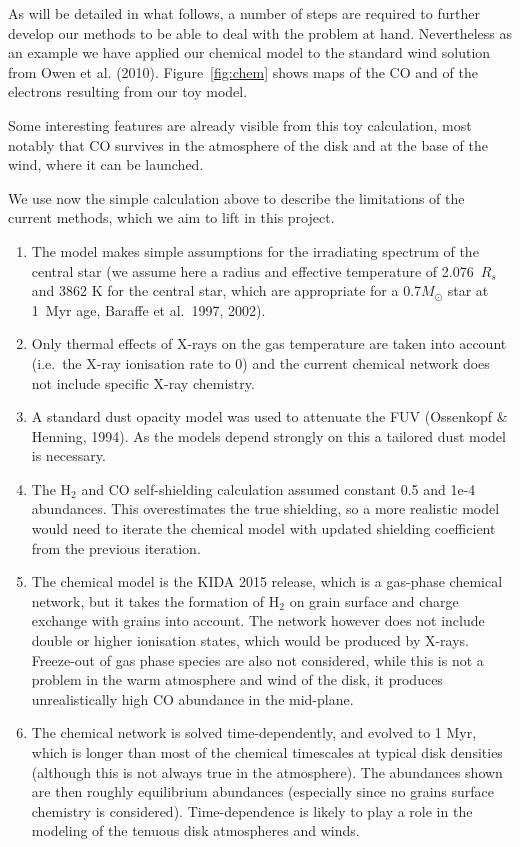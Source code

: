 \documentclass[10pt,fleqn,twoside]{article}
\begin{document}
As will be detailed in what follows, a number of steps are required to
further develop our methods to be able to deal with the problem at
hand. Nevertheless as an example we have applied our chemical model to
the standard wind solution from Owen et
al. (2010). Figure~\ref{fig:chem} shows maps of the CO and of the
electrons resulting from our toy model. 


Some interesting features are already visible from this toy
calculation, most notably that CO survives in the atmosphere of the
disk and at the base of the wind, where it can be launched. 

We use now the simple calculation above to describe the limitations of
the current methods, which we aim to lift in this project. 

\begin{enumerate}
\item The model makes simple assumptions for the irradiating spectrum
of the central star (we assume here a radius and effective temperature
of 2.076~$R_s$ and 3862 K for the central star, which are appropriate
for a 0.7$M_{\odot}$ star at 1~Myr age, Baraffe et al.\ 1997, 2002).

\item Only thermal effects of X-rays on the gas
temperature are taken into account (i.e.\ the X-ray ionisation rate
to 0) and the current chemical network does not include specific
X-ray chemistry. 

\item A standard dust opacity model was used to attenuate
the FUV (Ossenkopf \& Henning, 1994). As the models depend strongly on
this a tailored dust model is necessary. 

\item The H$_2$ and CO self-shielding
calculation assumed constant 0.5 and 1e-4 abundances. This overestimates the true
shielding, so a more realistic model would need to iterate the
chemical model with updated shielding coefficient from the previous
iteration.

\item The chemical model is the KIDA 2015 release, which is a gas-phase
chemical network, but it takes the formation of H$_2$ on grain surface and
charge exchange with grains into account. The network however does not
include double or higher ionisation states, which would be produced by
X-rays. Freeze-out of gas phase species are also not considered, while
this is not a problem in the warm atmosphere and wind of the disk, it produces
unrealistically high CO abundance in the mid-plane. 

\item The chemical network is solved time-dependently, and evolved to 1 Myr,
which is longer than most of the chemical timescales at typical disk
densities (although this is not always true in the atmosphere). The
abundances shown are then roughly equilibrium abundances (especially since no
grains surface chemistry is considered). Time-dependence is likely to
play a role in the modeling of the tenuous disk atmospheres and
winds. 
\end{enumerate}
\end{document}
